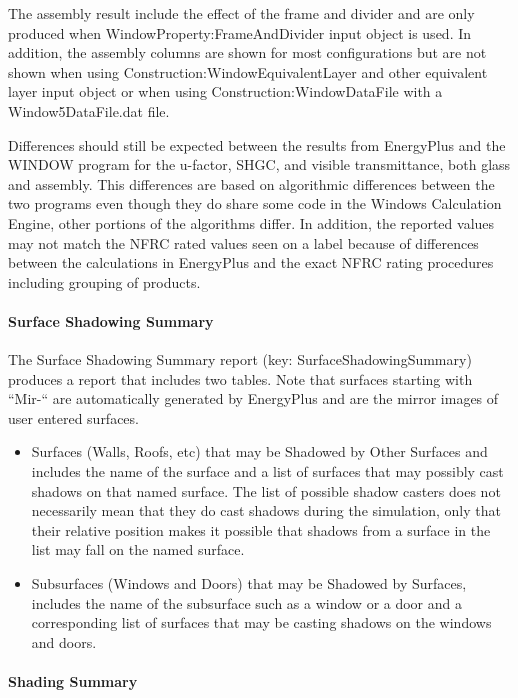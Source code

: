 The assembly result include the effect of the frame and divider and are only produced when WindowProperty:FrameAndDivider input object is used. In addition, the assembly columns are shown for most configurations but are not shown when using Construction:WindowEquivalentLayer and other equivalent layer input object or when using Construction:WindowDataFile with a Window5DataFile.dat file.

Differences should still be expected between the results from EnergyPlus and the WINDOW program for the u-factor, SHGC, and visible transmittance, both glass and assembly. This differences are based on algorithmic differences between the two programs even though they do share some code in the Windows Calculation Engine, other portions of the algorithms differ. In addition, the reported values may not match the NFRC rated values seen on a label because of differences between the calculations in EnergyPlus and the exact NFRC rating procedures including grouping of products.

\paragraph{Surface Shadowing Summary}\label{surface-shadowing-summary}

The Surface Shadowing Summary report (key: SurfaceShadowingSummary) produces a report that includes two tables. Note that surfaces starting with ``Mir-`` are automatically generated by EnergyPlus and are the mirror images of user entered surfaces.

\begin{itemize}
\item
  Surfaces (Walls, Roofs, etc) that may be Shadowed by Other Surfaces and includes the name of the surface and a list of surfaces that may possibly cast shadows on that named surface. The list of possible shadow casters does not necessarily mean that they do cast shadows during the simulation, only that their relative position makes it possible that shadows from a surface in the list may fall on the named surface.
\item
  Subsurfaces (Windows and Doors) that may be Shadowed by Surfaces, includes the name of the subsurface such as a window or a door and a corresponding list of surfaces that may be casting shadows on the windows and doors.
\end{itemize}

\paragraph{Shading Summary}\label{shading-summary}

